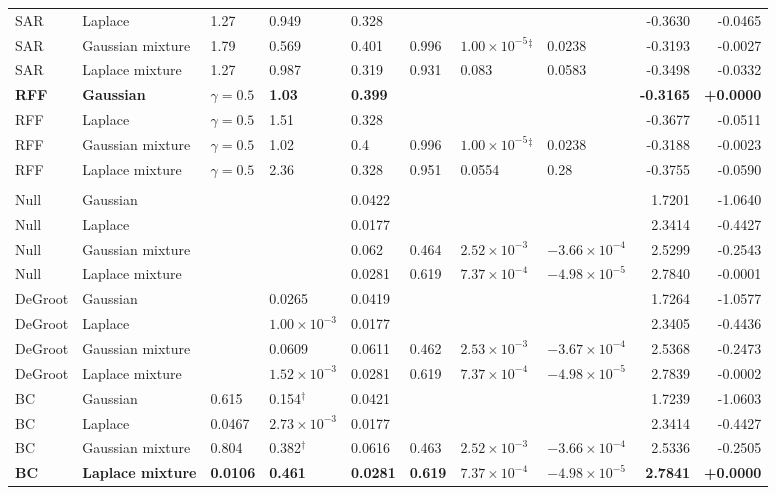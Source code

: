\begin{longtable}{llllllllrr}
SAR & Laplace & 1.27 & 0.949 & 0.328 &  &  &  & -0.3630 & -0.0465 \\
SAR & Gaussian mixture & 1.79 & 0.569 & 0.401 & 0.996 & $1.00\times10^{-5}$$^{\ddagger}$ & 0.0238 & -0.3193 & -0.0027 \\
SAR & Laplace mixture & 1.27 & 0.987 & 0.319 & 0.931 & 0.083 & 0.0583 & -0.3498 & -0.0332 \\
\textbf{RFF} & \textbf{Gaussian} & \textbf{$\gamma=0.5$} & \textbf{1.03} & \textbf{0.399} &  &  &  & \textbf{-0.3165} & \textbf{+0.0000} \\
RFF & Laplace & $\gamma=0.5$ & 1.51 & 0.328 &  &  &  & -0.3677 & -0.0511 \\
RFF & Gaussian mixture & $\gamma=0.5$ & 1.02 & 0.4 & 0.996 & $1.00\times10^{-5}$$^{\ddagger}$ & 0.0238 & -0.3188 & -0.0023 \\
RFF & Laplace mixture & $\gamma=0.5$ & 2.36 & 0.328 & 0.951 & 0.0554 & 0.28 & -0.3755 & -0.0590 \\
\midrule
\multicolumn{10}{l}{\kozitsin{}} \\
Null & Gaussian &  &  & 0.0422 &  &  &  & 1.7201 & -1.0640 \\
Null & Laplace &  &  & 0.0177 &  &  &  & 2.3414 & -0.4427 \\
Null & Gaussian mixture &  &  & 0.062 & 0.464 & $2.52\times10^{-3}$ & $-3.66\times10^{-4}$ & 2.5299 & -0.2543 \\
Null & Laplace mixture &  &  & 0.0281 & 0.619 & $7.37\times10^{-4}$ & $-4.98\times10^{-5}$ & 2.7840 & -0.0001 \\
DeGroot & Gaussian &  & 0.0265 & 0.0419 &  &  &  & 1.7264 & -1.0577 \\
DeGroot & Laplace &  & $1.00\times10^{-3}$ & 0.0177 &  &  &  & 2.3405 & -0.4436 \\
DeGroot & Gaussian mixture &  & 0.0609 & 0.0611 & 0.462 & $2.53\times10^{-3}$ & $-3.67\times10^{-4}$ & 2.5368 & -0.2473 \\
DeGroot & Laplace mixture &  & $1.52\times10^{-3}$ & 0.0281 & 0.619 & $7.37\times10^{-4}$ & $-4.98\times10^{-5}$ & 2.7839 & -0.0002 \\
BC & Gaussian & 0.615 & 0.154$^{\dagger}$ & 0.0421 &  &  &  & 1.7239 & -1.0603 \\
BC & Laplace & 0.0467 & $2.73\times10^{-3}$ & 0.0177 &  &  &  & 2.3414 & -0.4427 \\
BC & Gaussian mixture & 0.804 & 0.382$^{\dagger}$ & 0.0616 & 0.463 & $2.52\times10^{-3}$ & $-3.66\times10^{-4}$ & 2.5336 & -0.2505 \\
\textbf{BC} & \textbf{Laplace mixture} & \textbf{0.0106} & \textbf{0.461} & \textbf{0.0281} & \textbf{0.619} & \textbf{$7.37\times10^{-4}$} & \textbf{$-4.98\times10^{-5}$} & \textbf{2.7841} & \textbf{+0.0000} \\

\end{longtable}
